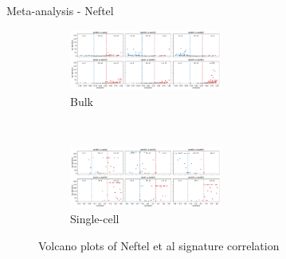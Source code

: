 \documentclass[aspectratio=169,9pt]{beamer}
\begin{document}
    \begin{frame}{Meta-analysis - Neftel}
        \begin{adjustwidth}{-5cm}{-5cm}
            \centering
            \begin{figure}
                \centering
                \begin{subfigure}[c]{\textwidth}
                    \centering
                    \includegraphics[width=0.55\textwidth]{volcano_Bulk_Nef}
                    \caption{Bulk}
                \end{subfigure}
                \\
                \begin{subfigure}[c]{\textwidth}
                    \centering
                    \includegraphics[width=0.55\textwidth]{volcano_SC_Nef}
                    \caption{Single-cell}
                \end{subfigure}
                \caption{Volcano plots of Neftel et al signature correlation}
            \end{figure}
        \end{adjustwidth}
    \end{frame}
\end{document}
